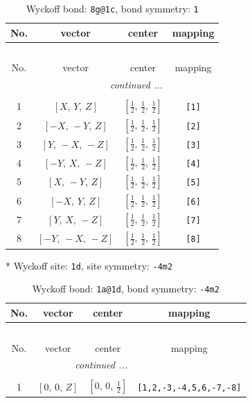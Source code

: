 \documentclass[fleqn,8pt]{jsarticle}
\begin{document}
\begin{longtable}{cccc}
\caption{Wyckoff bond: {\tt 8g@1c}, bond symmetry: {\tt 1}}
 \\
 \hline \hline
No. & vector & center & mapping \\ \hline \endfirsthead

\multicolumn{3}{l}{\tablename\ \thetable{}} \\
 \hline \hline
No. & vector & center & mapping \\ \hline \endhead

 \hline \hline
\multicolumn{3}{r}{\footnotesize\it continued ...} \\ \endfoot

 \hline \hline
\multicolumn{3}{r}{} \\ \endlastfoot

1 & $\left[ X,\, Y,\, Z \right]$ & $\left[ \frac{1}{2},\, \frac{1}{2},\, \frac{1}{2} \right]$ & {\tt [1]} \\ \hline
2 & $\left[ - X,\, - Y,\, Z \right]$ & $\left[ \frac{1}{2},\, \frac{1}{2},\, \frac{1}{2} \right]$ & {\tt [2]} \\ \hline
3 & $\left[ Y,\, - X,\, - Z \right]$ & $\left[ \frac{1}{2},\, \frac{1}{2},\, \frac{1}{2} \right]$ & {\tt [3]} \\ \hline
4 & $\left[ - Y,\, X,\, - Z \right]$ & $\left[ \frac{1}{2},\, \frac{1}{2},\, \frac{1}{2} \right]$ & {\tt [4]} \\ \hline
5 & $\left[ X,\, - Y,\, Z \right]$ & $\left[ \frac{1}{2},\, \frac{1}{2},\, \frac{1}{2} \right]$ & {\tt [5]} \\ \hline
6 & $\left[ - X,\, Y,\, Z \right]$ & $\left[ \frac{1}{2},\, \frac{1}{2},\, \frac{1}{2} \right]$ & {\tt [6]} \\ \hline
7 & $\left[ Y,\, X,\, - Z \right]$ & $\left[ \frac{1}{2},\, \frac{1}{2},\, \frac{1}{2} \right]$ & {\tt [7]} \\ \hline
8 & $\left[ - Y,\, - X,\, - Z \right]$ & $\left[ \frac{1}{2},\, \frac{1}{2},\, \frac{1}{2} \right]$ & {\tt [8]} \\
\end{longtable}
* Wyckoff site: {\tt 1d}, site symmetry: {\tt -4m2}
\renewcommand{\arraystretch}{1.2}
\begin{longtable}{cccc}
\caption{Wyckoff bond: {\tt 1a@1d}, bond symmetry: {\tt -4m2}}
 \\
 \hline \hline
No. & vector & center & mapping \\ \hline \endfirsthead

\multicolumn{3}{l}{\tablename\ \thetable{}} \\
 \hline \hline
No. & vector & center & mapping \\ \hline \endhead

 \hline \hline
\multicolumn{3}{r}{\footnotesize\it continued ...} \\ \endfoot

 \hline \hline
\multicolumn{3}{r}{} \\ \endlastfoot

1 & $\left[ 0,\, 0,\, Z \right]$ & $\left[ 0,\, 0,\, \frac{1}{2} \right]$ & {\tt [1,2,-3,-4,5,6,-7,-8]} \\
\end{longtable}
\end{document}
